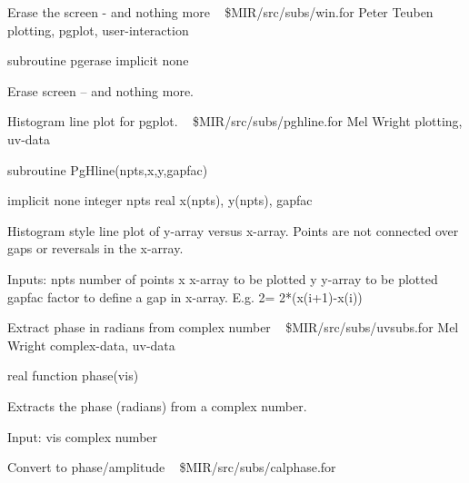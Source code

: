 %
\noindent Erase the screen - and nothing more
\newline \ 
\newline {} \$MIR/src/subs/win.for
\newline {} Peter Teuben
\newline {} plotting, pgplot, user-interaction
\par{\tenpoint
{\eightpoint\begintt
        subroutine pgerase
        implicit none

  Erase screen -- and nothing more.
\endtt}
\par}
%
\noindent Histogram line plot for pgplot.
\newline \ 
\newline {} \$MIR/src/subs/pghline.for
\newline {} Mel Wright
\newline \abox{Keywords:} plotting, uv-data
\par{\tenpoint
{\eightpoint\begintt
        subroutine PgHline(npts,x,y,gapfac)

        implicit none
        integer npts
        real x(npts), y(npts), gapfac

  Histogram style line plot of y-array versus x-array. Points are not
  connected over gaps or reversals in the x-array.

  Inputs:
    npts       number of points
    x          x-array to be plotted
    y          y-array to be plotted
    gapfac     factor to define a gap in x-array. E.g. 2= 2*(x(i+1)-x(i)) 
\endtt}
\par}
%
\noindent Extract phase in radians from complex number
\newline \ 
\newline {} \$MIR/src/subs/uvsubs.for
\newline \abox{Responsible:} Mel Wright
\newline {} complex-data, uv-data
\par{\tenpoint
{\eightpoint\begintt
        real function phase(vis)

  Extracts the phase (radians) from a complex number.

  Input:
    vis        complex number
\endtt}
\par}
%
\noindent Convert to phase/amplitude
\newline \ 
\newline {} \$MIR/src/subs/calphase.for
